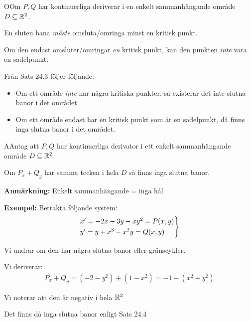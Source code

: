 \begin{theo}
  OOm $P,Q$ har kontinuerliga deriverar i en enkelt sammanhängande område $D\subseteq\mathbb{R}^2$.\par
  \noindent En sluten bana \textit{måste} omsluta/omringa minst en kritisk punkt.\par
  \noindent Om den endast omsluter/omringar \textit{en} kritisk punkt, kan den punkten \textit{inte} vara en sadelpunkt. 
\end{theo}
\par\bigskip
\noindent Från Sats 24.3 följer följande:
\begin{itemize}
  \item Om ett område \textit{inte} har några kritiska punkter, så existerar det inte slutna banor i det området
  \item Om ett område endast har en kritisk punkt som är en sadelpunkt, då finns inga slutna banor i det området.
\end{itemize}
\par\bigskip
\begin{theo}
  AAntag att $P,Q$ har kontinuerliga derivator i ett enkelt sammanhängande område $D\subseteq\mathbb{R}^2$\par
  \noindent Om $P_x+Q_y$ har samma tecken i hela $D$ så finns inga slutna banor. 
\end{theo}
\par\bigskip
\noindent\textbf{Anmärkning:} Enkelt sammanhängande = inga hål
\par\bigskip

\noindent\textbf{Exempel:} Betrakta följande system:
\begin{equation*}
  \begin{gathered}
    \begin{rcases*}
      x^{\prime} = -2x-3y-xy^2 = P(x,y)\\
      y^{\prime} = y+x^3-x^2y = Q(x,y)
    \end{rcases*}
  \end{gathered}
\end{equation*}
\par\bigskip
\noindent Vi undrar om den har några slutna banor eller gränscykler.\par
\noindent Vi deriverar:
\begin{equation*}
  \begin{gathered}
    P_x+Q_y = (-2-y^2)+(1-x^2)=-1-(x^2+y^2)
  \end{gathered}
\end{equation*}
\par\bigskip

\noindent Vi noterar att den är negativ i hela $\mathbb{R}^2$\par
\noindent Det finns då inga slutna banor enligt Sats 24.4 

